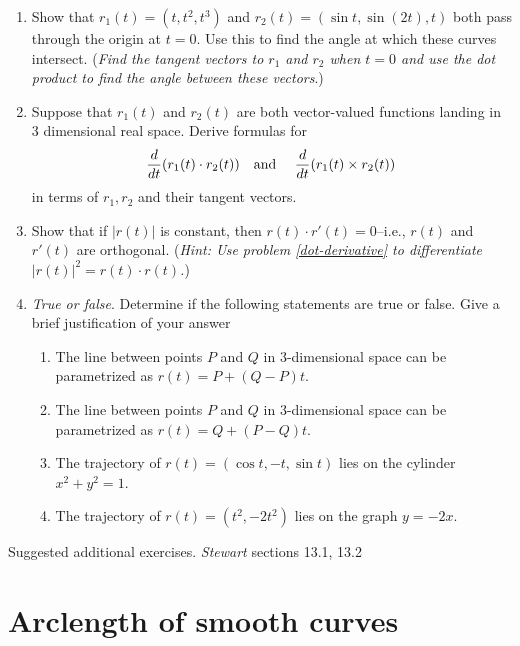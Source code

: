 \documentclass[12pt]{article}
\numberwithin{equation}{subsection}
\numberwithin{figure}{subsection}
\theoremstyle{note}
\begin{document}
{\begin{enumerate}[label=\arabic*.]

\item Show that $r_1(t)=(t, t^2, t^3)$ and $r_2(t)=(\sin t, \sin(2t), t)$ both pass through the origin at $t=0$. Use this to find the angle at which these curves intersect. (\textit{Find the tangent vectors to $r_1$ and $r_2$ when $t=0$ and use the dot product to find the angle between these vectors}.)


\item \label{dot-derivative} Suppose that $r_1(t)$ and $r_2(t)$ are both vector-valued functions landing in 3 dimensional real space. Derive formulas for \[ \dfrac{d}{dt} (r_1(t)\cdot r_2(t)) \text{\quad and \quad }\dfrac{d}{dt} (r_1(t) \times r_2(t))\] in terms of $r_1, r_2$ and their tangent vectors. 

\item Show that if $|r(t)|$ is constant, then $r(t)\cdot r'(t)=0$--i.e., $r(t)$ and $r'(t)$ are orthogonal. (\textit{Hint: Use problem \ref{dot-derivative} to differentiate $|r(t)|^2=r(t)\cdot r(t)$.}) \label{tan-to-derivative}

\item \textit{True or false}. Determine if the following statements are true or false. Give a brief justification of your answer

\begin{enumerate}
	\item The line between points $P$ and $Q$ in 3-dimensional space can be parametrized as $r(t)=P+(Q-P)t$.
	\item The line between points $P$ and $Q$ in 3-dimensional space can be parametrized as $r(t)=Q+(P-Q)t$.
	\item The trajectory of $r(t)=( \cos t, -t, \sin t)$ lies on the cylinder $x^2+y^2=1$. 
	\item The trajectory of $r(t)=(t^2,-2t^2)$ lies on the graph $y=-2x$.
\end{enumerate}
\end{enumerate}

Suggested additional exercises. \textit{Stewart} sections 13.1, 13.2



\section{Arclength of smooth curves}


}
\end{document}
